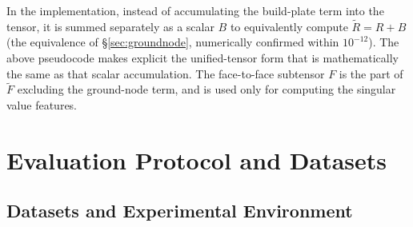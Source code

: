 \documentclass[11pt,a4paper]{article}
\begin{document}
In the implementation, instead of accumulating the build-plate term into the tensor, it is summed separately as a scalar $B$
to equivalently compute $\tilde R=R+B$ (the equivalence of \S\ref{sec:groundnode}, numerically confirmed within $10^{-12}$).
The above pseudocode makes explicit the unified-tensor form that is mathematically the same as that scalar accumulation.
The face-to-face subtensor $F$ is the part of $\tilde F$ excluding the ground-node term, and is used only for computing the singular value features.

\section{Evaluation Protocol and Datasets}

\subsection{Datasets and Experimental Environment}
\label{sec:datasets}
\end{document}
